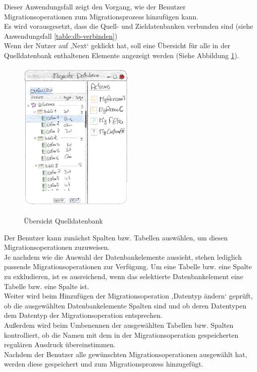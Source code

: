 Dieser Anwendungsfall zeigt den Vorgang, wie der Benutzer Migrationsoperationen zum Migrationsprozess hinzufügen kann.\\
Es wird vorausgesetzt, dass die Quell- und Zieldatenbanken verbunden sind (siehe Anwendungsfall \ref{table:db-verbinden})\\
Wenn der Nutzer auf ,Next‘ geklickt hat, soll eine Übersicht für alle in der Quelldatenbank enthaltenen Elemente angezeigt werden (Siehe Abbildung \ref{img:overview}).
\begin{figure}[H]
	\caption{Übersicht Quelldatenbank}
	\centering
	\includegraphics[width=0.5\textwidth]{images/overview}
	\label{img:overview}
\end{figure}
Der Benutzer kann zunächst Spalten bzw. Tabellen auswählen, um diesen Migrationsoperationen zuzuweisen.\\
Je nachdem wie die Auswahl der Datenbankelemente aussieht, stehen lediglich passende Migrationsoperationen zur Verfügung. Um eine Tabelle bzw. eine Spalte zu exkludieren, ist es ausreichend, wenn das selektierte Datenbankelement eine Tabelle bzw. eine Spalte ist.\\
Weiter wird beim Hinzufügen der Migrationsoperation ‚Datentyp ändern‘ geprüft, ob die ausgewählten Datenbankelemente Spalten sind und ob deren Datentypen dem Datentyp der Migrationsoperation entsprechen.\\
Außerdem wird beim Umbenennen der ausgewählten Tabellen bzw. Spalten kontrolliert, ob die Namen mit dem in der Migrationsoperation gespeicherten regulären Ausdruck übereinstimmen. \\
Nachdem der Benutzer alle gewünschten Migrationsoperationen ausgewählt hat, werden diese gespeichert und zum Migrationsprozess hinzugefügt.

